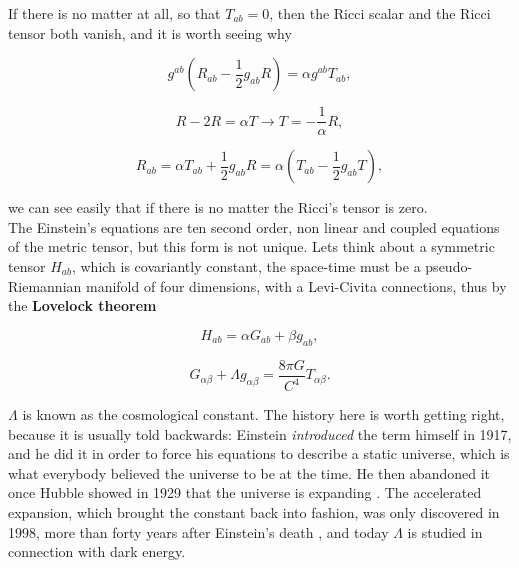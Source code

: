             If there is no matter at all, so that $T_{ab}=0$, then the Ricci scalar and the Ricci tensor both vanish, and it is worth seeing why

            \begin{equation*}
                g^{ab}\left(R_{ab} - \frac{1}{2}g_{ab}R \right) = \alpha g^{ab}T_{ab},
            \end{equation*}

            \begin{equation*}
                R-2R = \alpha T \rightarrow T = -\frac{1}{\alpha}R,
            \end{equation*}

            \begin{equation}
                R_{ab} = \alpha T_{ab}+\frac{1}{2}g_{ab}R = \alpha\left(T_{ab}-\frac{1}{2}g_{ab}T \right),
            \end{equation}

            we can see easily that if there is no matter the Ricci's tensor is zero.\\

            The Einstein's equations are ten second order, non linear and coupled equations of the metric tensor, but this form is not unique. Lets think about a symmetric tensor $H_{ab}$, which is covariantly constant, the space-time must be a pseudo-Riemannian manifold of four dimensions, with a Levi-Civita connections, thus by the \textbf{Lovelock theorem}

            \begin{equation}
                H_{ab}=\alpha G_{ab} + \beta g_{ab},
            \end{equation}

            \begin{equation}
                G_{\alpha\beta} + \Lambda g_{\alpha\beta} = \frac{8\pi G}{C^4}T_{\alpha\beta}.
            \end{equation}

            $\Lambda$ is known as the cosmological constant. The history here is worth getting right, because it is usually told backwards: Einstein \textit{introduced} the term himself in 1917, and he did it in order to force his equations to describe a static universe, which is what everybody believed the universe to be at the time. He then abandoned it once Hubble showed in 1929 that the universe is expanding \citep{hubble1929}. The accelerated expansion, which brought the constant back into fashion, was only discovered in 1998, more than forty years after Einstein's death \citep{riess1998,perlmutter1999}, and today $\Lambda$ is studied in connection with dark energy.

